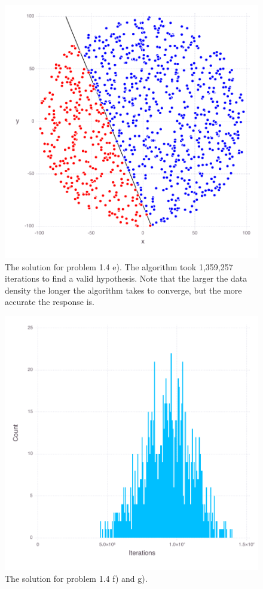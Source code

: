 \documentclass[11pt,letterpaper]{article}
\begin{document}
\begin{figure}
	\centering
    \includegraphics[width=\textwidth]{problem_1_4e.pdf}
	\caption{The solution for problem 1.4 e).  The algorithm took 1,359,257 iterations to find a valid hypothesis.  Note that the larger the data density the longer the algorithm takes to converge, but the more accurate the response is.}
\end{figure}


\begin{figure}
	\centering
    \includegraphics[width=\textwidth]{problem_1_4g.pdf}
	\caption{The solution for problem 1.4 f) and g).  }
\end{figure}
\end{document}
